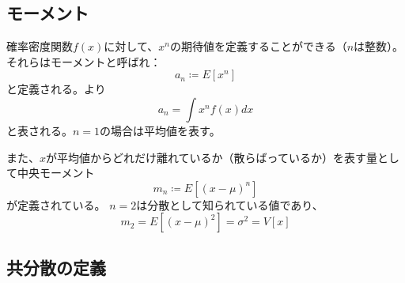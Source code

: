 \subsection{モーメント}
確率密度関数$f(x)$に対して、$x^n$の期待値を定義することができる（$n$は整数）。
それらはモーメントと呼ばれ：
\begin{equation}
  a_n \coloneqq E[x^n]
\end{equation}
と定義される。より
\begin{equation}
  a_n = \int x^n f(x) dx
\end{equation}
と表される。$n=1$の場合は平均値を表す。

また、$x$が平均値からどれだけ離れているか（散らばっているか）を表す量として中央モーメント
\begin{equation}
  m_n \coloneqq E[(x-\mu)^n]
\end{equation}
が定義されている。
$n=2$は分散として知られている値であり、
\begin{equation}
  m_2 = E[(x-\mu)^2] = \sigma^2 = V[x]
\end{equation}


\subsection{共分散の定義}

